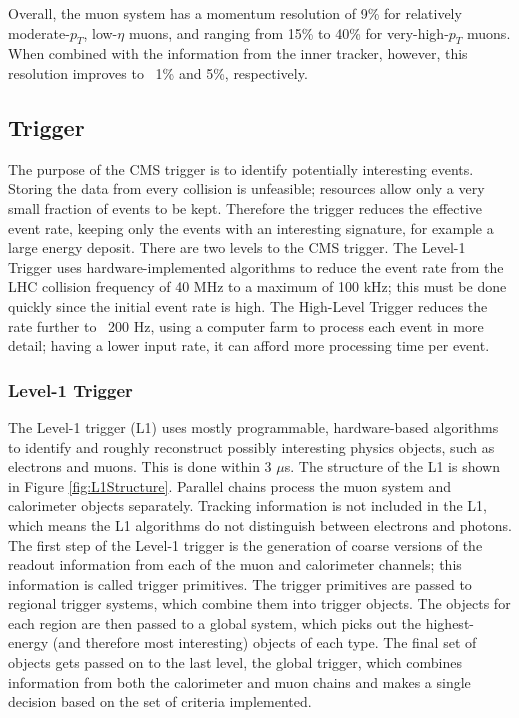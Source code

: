 Overall, the muon system has a momentum resolution 
of 9\% for relatively moderate-$p_T$, low-$\eta$ muons, 
and ranging from 15\% to 40\% for very-high-$p_T$ muons.  
When combined with the information from the inner tracker, 
however, this resolution improves to ~1\% and 5\%, respectively.  

\subsection{Trigger}
The purpose of the CMS trigger is to 
identify potentially interesting events.  
Storing the data from every collision is unfeasible; 
resources allow only a very small fraction of events to be kept.  
Therefore the trigger reduces the effective event rate, 
keeping only the events with an interesting signature, 
for example a large energy deposit.  
There are two levels to the CMS trigger.  
The Level-1 Trigger uses hardware-implemented algorithms to 
reduce the event rate from the LHC collision frequency of 40 MHz 
to a maximum of 100 kHz; 
this must be done quickly since the initial event rate is high. 
The High-Level Trigger reduces the rate further to ~200 Hz, %
using a computer farm to process each event in more detail; 
having a lower input rate, it can afford more processing time per event.  


\subsubsection{Level-1 Trigger}

The Level-1 trigger (L1) uses mostly programmable, hardware-based algorithms 
to identify and roughly reconstruct possibly interesting physics objects, 
such as electrons and muons.  
This is done within 3 $\mu$s.  
The structure of the L1 is shown in Figure \ref{fig:L1Structure}.  
Parallel chains process the muon system and calorimeter objects separately. 
Tracking information is not included in the L1, 
which means the L1 algorithms do not distinguish 
between electrons and photons. 
The first step of the Level-1 trigger is the generation 
of coarse versions of the readout information 
from each of the muon and calorimeter channels; 
this information is called trigger primitives.  
The trigger primitives are passed to regional trigger systems, 
which combine them into trigger objects.  
The objects for each region are then passed to a global system, 
which picks out the highest-energy (and therefore most interesting) 
objects of each type.
The final set of objects gets passed on to the last level, 
the global trigger, which combines information from both 
the calorimeter and muon chains 
and makes a single decision based on the set of criteria implemented.  

